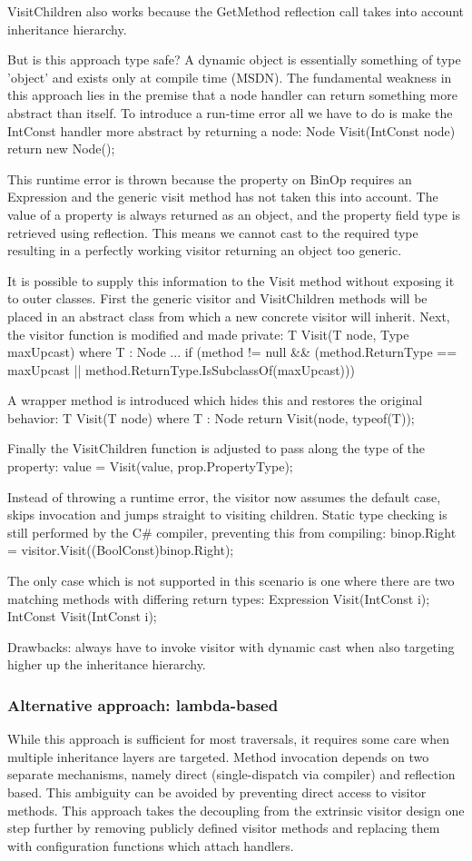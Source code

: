 \documentclass[final,a4paper,12pt]{article}
\begin{document}
VisitChildren also works because the GetMethod reflection call takes into account inheritance hierarchy.

But is this approach type safe? A dynamic object is essentially something of type 'object' and exists only at compile time (MSDN). The fundamental weakness in this approach lies in the premise that a node handler can return something more abstract than itself. To introduce a run-time error all we have to do is make the IntConst handler more abstract by returning a node:
	Node Visit(IntConst node) { return new Node(); }

This runtime error is thrown because the property on BinOp requires an Expression and the generic visit method has not taken this into account. The value of a property is always returned as an object, and the property field type is retrieved using reflection. This means we cannot cast to the required type resulting in a perfectly working visitor returning an object too generic.

It is possible to supply this information to the Visit method without exposing it to outer classes. First the generic visitor and VisitChildren methods will be placed in an abstract class from which a new concrete visitor will inherit. Next, the visitor function is modified and made private:
	T Visit(T node, Type maxUpcast) where T : Node
		...
		if (method != null \&\& (method.ReturnType == maxUpcast || method.ReturnType.IsSubclassOf(maxUpcast)))

A wrapper method is introduced which hides this and restores the original behavior:
	T Visit(T node) where T : Node
		return Visit(node, typeof(T));
		
Finally the VisitChildren function is adjusted to pass along the type of the property:
	value = Visit(value, prop.PropertyType);
	
Instead of throwing a runtime error, the visitor now assumes the default case, skips invocation and jumps straight to visiting children. Static type checking is still performed by the C\# compiler, preventing this from compiling:
	binop.Right = visitor.Visit((BoolConst)binop.Right);

The only case which is not supported in this scenario is one where there are two matching methods with differing return types:
	Expression Visit(IntConst i);
	IntConst Visit(IntConst i);

Drawbacks: always have to invoke visitor with dynamic cast when also targeting higher up the inheritance hierarchy.

\subsubsection{Alternative approach: lambda-based}
While this approach is sufficient for most traversals, it requires some care when multiple inheritance layers are targeted. Method invocation depends on two separate mechanisms, namely direct (single-dispatch via compiler) and reflection based. This ambiguity can be avoided by preventing direct access to visitor methods. This approach takes the decoupling from the extrinsic visitor design one step further by removing publicly defined visitor methods and replacing them with configuration functions which attach handlers.
\end{document}
